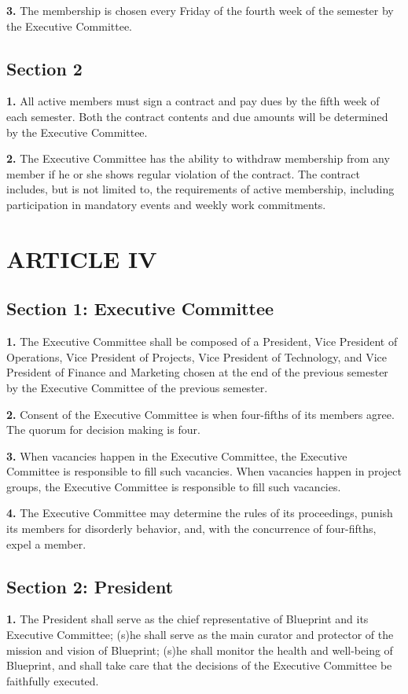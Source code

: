 \documentclass{article}
\begin{document}
\textbf{3.} The membership is chosen every Friday of the fourth week of the semester by the Executive Committee.

\subsection{Section 2}
\textbf{1.} All active members must sign a contract and pay dues by the fifth week of each semester. Both the contract contents and due amounts will be determined by the Executive Committee.

\textbf{2.} The Executive Committee has the ability to withdraw membership from any member if he or she shows regular violation of the contract. The contract includes, but is not limited to, the requirements of active membership, including participation in mandatory events and weekly work commitments.

\section{ARTICLE IV}
\subsection{Section 1: Executive Committee}
\textbf{1.} The Executive Committee shall be composed of a President, Vice President of Operations, Vice President of Projects, Vice President of Technology, and Vice President of Finance and Marketing chosen at the end of the previous semester by the Executive Committee of the previous semester.

\textbf{2.} Consent of the Executive Committee is when four-fifths of its members agree. The quorum for decision making is four.

\textbf{3.} When vacancies happen in the Executive Committee, the Executive Committee is responsible to fill such vacancies. When vacancies happen in project groups, the Executive Committee is responsible to fill such vacancies.

\textbf{4.} The Executive Committee may determine the rules of its proceedings, punish its members for disorderly behavior, and, with the concurrence of four-fifths, expel a member.

\subsection{Section 2: President}

\textbf{1.} The President shall serve as the chief representative of Blueprint and its Executive Committee; (s)he shall serve as the main curator and protector of the mission and vision of Blueprint; (s)he shall monitor the health and well-being of Blueprint, and shall take care that the decisions of the Executive Committee be faithfully executed.
\end{document}
